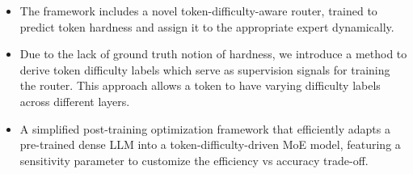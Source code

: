 \begin{itemize}
    \item The framework includes a novel token-difficulty-aware router, trained to predict token hardness and assign it to the appropriate expert dynamically.
    
    \item Due to the lack of ground truth notion of hardness, we introduce a method to derive token difficulty labels which serve as supervision signals for training the router. This approach allows a token to have varying difficulty labels across different layers.

    \item A simplified post-training optimization framework that efficiently adapts a pre-trained dense LLM into a token-difficulty-driven MoE model, featuring a sensitivity parameter to customize the efficiency vs accuracy trade-off.

    
\end{itemize}




